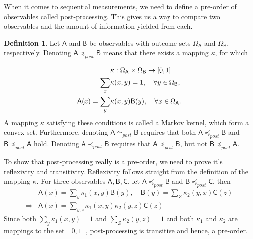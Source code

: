 \documentclass[a4paper,12pt]{wihuri}
\theoremstyle{definition}
\newtheorem{definition}{Definition}
\numberwithin{definition}{section}
\numberwithin{example}{section}
\numberwithin{theorem}{section}
\numberwithin{proposition}{section}
\numberwithin{lemma}{section}
\newcommand{\A}{\mathsf{A}}%
\newcommand{\B}{\mathsf{B}}%
\newcommand{\C}{\mathsf{C}}%
\newcommand{\pp}{\preceq_{post}}
\newcommand{\spp}{\simeq_{post}}
\newcommand{\ppeq}{\prec_{post}}
\begin{document}
When it comes to sequential measurements, we need to define a pre-order of observables called post-processing. This gives us a way to compare two observables and the amount of information yielded from each.
\begin{definition}
Let $\A$ and $\B$ be observables with outcome sets $\Omega_\A$ and $\Omega_\B$, respectively. Denoting $\A \pp \B$ means that there exists a mapping $\kappa$, for which

\begin{align*}
&\kappa : \Omega_\A \times \Omega_\B \rightarrow [0,1]\\
\sum_x &\kappa(x,y) = 1, \quad \forall y \in \Omega_\B, \\
\A(x) = \sum_y &\kappa(x,y)\B(y), \quad \forall x \in \Omega_\A\text.
\end{align*}
A mapping $\kappa$ satisfying these conditions is called a Markov kernel, which form a convex set. Furthermore, denoting $\A \spp \B$ requires that both $\A \pp \B$ and $\B \pp \A$ hold. Denoting $\A \ppeq \B$ requires that $\A \pp \B$, but not $\B \pp \A$.

To show that post-processing really is a pre-order, we need to prove it's reflexivity and transitivity. Reflexivity follows straight from the definition of the mapping $\kappa$. For three observables $\A, \B, \C$, let $\A \pp \B$ and $\B \pp \C$, then
\begin{align*}
&\A(x) = \sum_y \kappa_1(x,y) \B(y), \quad \B(y) = \sum_Z \kappa_2(y,x) \C(z) \\
\Rightarrow & \A(x) = \sum_{y,z} \kappa_1(x,y)\kappa_2(y,z)\C(z)
\end{align*}
Since both $\sum_y \kappa_1(x,y) = 1$ and $\sum_Z \kappa_2(y,z) = 1$ and both $\kappa_1$ and $\kappa_2$ are mappings to the set $[0,1]$, post-processing is transitive and hence, a pre-order.
\end{definition}
\end{document}

